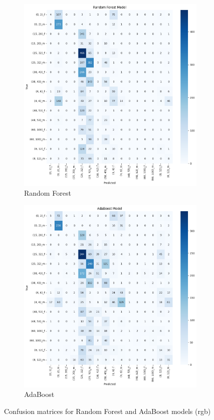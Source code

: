 \documentclass{article}
\begin{document}
\begin{figure}[H]
    \centering
    \begin{subfigure}[b]{0.48\textwidth}
        \includegraphics[width=\textwidth]{assets/confusion_matrix/rgb/RF Model.png}
        \caption{Random Forest}
    \end{subfigure}
    \hfill
    \begin{subfigure}[b]{0.48\textwidth}
        \includegraphics[width=\textwidth]{assets/confusion_matrix/rgb/AdaBoost Model.png}
        \caption{AdaBoost}
    \end{subfigure}
    \caption{Confusion matrices for Random Forest and AdaBoost models (rgb)}
    \label{fig:rgb_confusion_matrices_2}
\end{figure}
\end{document}
